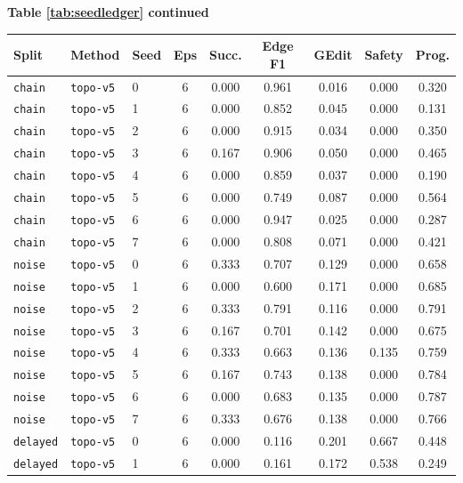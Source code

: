 \documentclass{article}
\begin{document}
\begin{center}
\textbf{Table \ref{tab:seedledger} continued}\\[0.4ex]
\begin{tabular}{lllcccccc}
\toprule
Split & Method & Seed & Eps & Succ. & Edge F1 & GEdit & Safety & Prog. \\
\midrule
\texttt{chain} & \texttt{topo-v5} & 0 & 6 & 0.000 & 0.961 & 0.016 & 0.000 & 0.320 \\
\texttt{chain} & \texttt{topo-v5} & 1 & 6 & 0.000 & 0.852 & 0.045 & 0.000 & 0.131 \\
\texttt{chain} & \texttt{topo-v5} & 2 & 6 & 0.000 & 0.915 & 0.034 & 0.000 & 0.350 \\
\texttt{chain} & \texttt{topo-v5} & 3 & 6 & 0.167 & 0.906 & 0.050 & 0.000 & 0.465 \\
\texttt{chain} & \texttt{topo-v5} & 4 & 6 & 0.000 & 0.859 & 0.037 & 0.000 & 0.190 \\
\texttt{chain} & \texttt{topo-v5} & 5 & 6 & 0.000 & 0.749 & 0.087 & 0.000 & 0.564 \\
\texttt{chain} & \texttt{topo-v5} & 6 & 6 & 0.000 & 0.947 & 0.025 & 0.000 & 0.287 \\
\texttt{chain} & \texttt{topo-v5} & 7 & 6 & 0.000 & 0.808 & 0.071 & 0.000 & 0.421 \\
\texttt{noise} & \texttt{topo-v5} & 0 & 6 & 0.333 & 0.707 & 0.129 & 0.000 & 0.658 \\
\texttt{noise} & \texttt{topo-v5} & 1 & 6 & 0.000 & 0.600 & 0.171 & 0.000 & 0.685 \\
\texttt{noise} & \texttt{topo-v5} & 2 & 6 & 0.333 & 0.791 & 0.116 & 0.000 & 0.791 \\
\texttt{noise} & \texttt{topo-v5} & 3 & 6 & 0.167 & 0.701 & 0.142 & 0.000 & 0.675 \\
\texttt{noise} & \texttt{topo-v5} & 4 & 6 & 0.333 & 0.663 & 0.136 & 0.135 & 0.759 \\
\texttt{noise} & \texttt{topo-v5} & 5 & 6 & 0.167 & 0.743 & 0.138 & 0.000 & 0.784 \\
\texttt{noise} & \texttt{topo-v5} & 6 & 6 & 0.000 & 0.683 & 0.135 & 0.000 & 0.787 \\
\texttt{noise} & \texttt{topo-v5} & 7 & 6 & 0.333 & 0.676 & 0.138 & 0.000 & 0.766 \\
\texttt{delayed} & \texttt{topo-v5} & 0 & 6 & 0.000 & 0.116 & 0.201 & 0.667 & 0.448 \\
\texttt{delayed} & \texttt{topo-v5} & 1 & 6 & 0.000 & 0.161 & 0.172 & 0.538 & 0.249 \\

\end{tabular}
\end{center}
\end{document}
